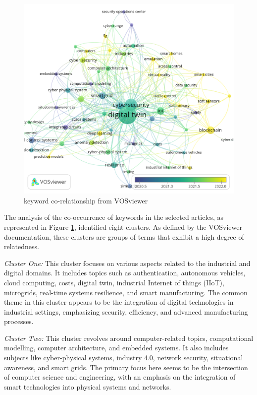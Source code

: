 \begin{figure}[H]
    \includegraphics[width=\textwidth, center]{images/newimages/vosviewer-2oc.png}
    \caption{keyword co-relationship from VOSviewer}
    \label{fig:co-occurrence-vosv}
\end{figure}

The analysis of the co-occurrence of keywords in the selected articles, as represented in Figure \ref{fig:co-occurrence-vosv}, identified eight clusters. As defined by the VOSviewer documentation, these clusters are groups of terms that exhibit a high degree of relatedness. 


\textit{Cluster One:}
This cluster focuses on various aspects related to the industrial and digital domains. It includes topics such as authentication, autonomous vehicles, cloud computing, costs, digital twin, industrial Internet of things (IIoT), microgrids, real-time systems resilience, and smart manufacturing. The common theme in this cluster appears to be the integration of digital technologies in industrial settings, emphasizing security, efficiency, and advanced manufacturing processes.

\textit{Cluster Two:}
This cluster revolves around computer-related topics, computational modelling, computer architecture, and embedded systems. It also includes subjects like cyber-physical systems, industry 4.0, network security, situational awareness, and smart grids. The primary focus here seems to be the intersection of computer science and engineering, with an emphasis on the integration of smart technologies into physical systems and networks.

